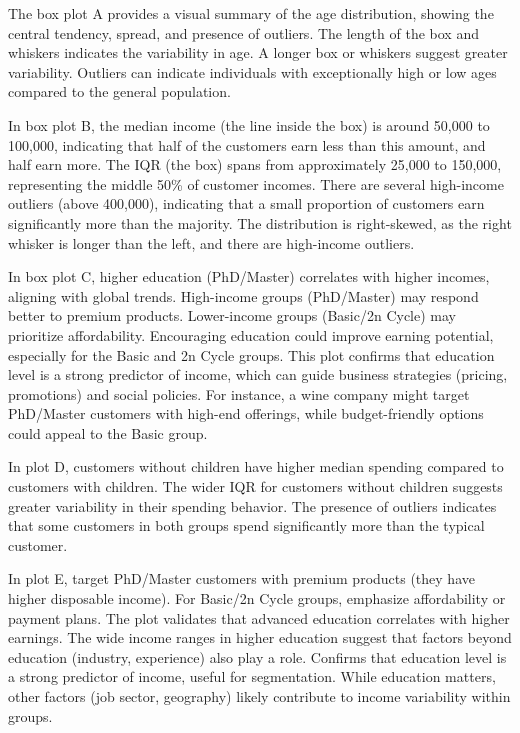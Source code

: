 \documentclass[a4paper]{article}
\begin{document}
\begin{multicols}{2} 

The box plot A provides a visual summary of the age distribution, showing the central tendency, spread, and presence of outliers.
The length of the box and whiskers indicates the variability in age. A longer box or whiskers suggest greater variability.
Outliers can indicate individuals with exceptionally high or low ages compared to the general population.


In box plot B, the median income (the line inside the box) is around 50,000 to 100,000, indicating that half of the customers earn less than this amount, and half earn more.
The IQR (the box) spans from approximately 25,000 to 150,000, representing the middle 50\% of customer incomes.
There are several high-income outliers (above 400,000), indicating that a small proportion of customers earn significantly more than the majority.
The distribution is right-skewed, as the right whisker is longer than the left, and there are high-income outliers.


In box plot C, higher education (PhD/Master) correlates with higher incomes, aligning with global trends.
High-income groups (PhD/Master) may respond better to premium products.
Lower-income groups (Basic/2n Cycle) may prioritize affordability.
Encouraging education could improve earning potential, especially for the Basic and 2n Cycle groups.
This plot confirms that education level is a strong predictor of income, which can guide business strategies (pricing, promotions) and social policies. For instance, a wine company might target PhD/Master customers with high-end offerings, while budget-friendly options could appeal to the Basic group.


In plot D, customers without children have higher median spending compared to customers with children.
The wider IQR for customers without children suggests greater variability in their spending behavior.
The presence of outliers indicates that some customers in both groups spend significantly more than the typical customer.


In plot E, target PhD/Master customers with premium products (they have higher disposable income).
For Basic/2n Cycle groups, emphasize affordability or payment plans.
The plot validates that advanced education correlates with higher earnings.
The wide income ranges in higher education suggest that factors beyond education (industry, experience) also play a role.
Confirms that education level is a strong predictor of income, useful for segmentation.
While education matters, other factors (job sector, geography) likely contribute to income variability within groups.


\end{multicols}
\end{document}
